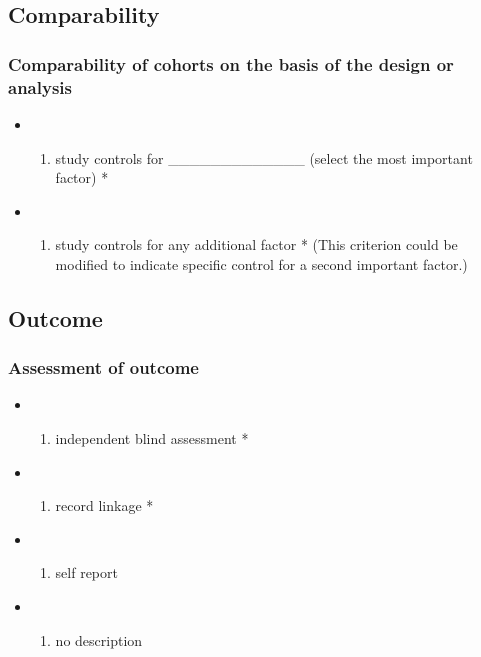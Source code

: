 \documentclass[
  doc, a4paper]{apa7}
\providecommand{\tightlist}{%
  \setlength{\itemsep}{0pt}\setlength{\parskip}{0pt}}
\begin{document}
\subsection{Comparability}\label{comparability-1}

\subsubsection{Comparability of cohorts on the basis of the design or analysis}\label{comparability-of-cohorts-on-the-basis-of-the-design-or-analysis}

\begin{itemize}
\tightlist
\item
  \begin{enumerate}
  \def\labelenumi{\alph{enumi})}
  \tightlist
  \item
    study controls for \_\_\_\_\_\_\_\_\_\_\_\_\_ (select the most important factor) *
  \end{enumerate}
\item
  \begin{enumerate}
  \def\labelenumi{\alph{enumi})}
  \setcounter{enumi}{1}
  \tightlist
  \item
    study controls for any additional factor * (This criterion could be modified to indicate specific control for a second important factor.)
  \end{enumerate}
\end{itemize}

\subsection{Outcome}\label{outcome}

\subsubsection{Assessment of outcome}\label{assessment-of-outcome}

\begin{itemize}
\tightlist
\item
  \begin{enumerate}
  \def\labelenumi{\alph{enumi})}
  \tightlist
  \item
    independent blind assessment *
  \end{enumerate}
\item
  \begin{enumerate}
  \def\labelenumi{\alph{enumi})}
  \setcounter{enumi}{1}
  \tightlist
  \item
    record linkage *
  \end{enumerate}
\item
  \begin{enumerate}
  \def\labelenumi{\alph{enumi})}
  \setcounter{enumi}{2}
  \tightlist
  \item
    self report
  \end{enumerate}
\item
  \begin{enumerate}
  \def\labelenumi{\alph{enumi})}
  \setcounter{enumi}{3}
  \tightlist
  \item
    no description
  \end{enumerate}
\end{itemize}
\end{document}
